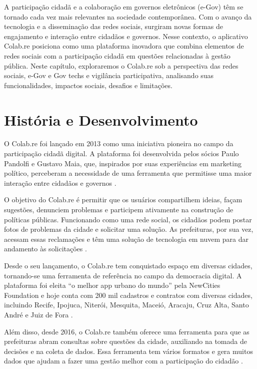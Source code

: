 A participação cidadã e a colaboração em governos eletrônicos (e-Gov) têm se tornado cada vez mais relevantes na sociedade contemporânea. Com o avanço da tecnologia e a disseminação das redes sociais, surgiram novas formas de engajamento e interação entre cidadãos e governos. Nesse contexto, o aplicativo Colab.re posiciona como uma plataforma inovadora que combina elementos de redes sociais com a participação cidadã em questões relacionadas à gestão pública. Neste capítulo, exploraremos o Colab.re sob a perspectiva das redes sociais, e-Gov e Gov techs e vigilância participativa, analisando suas funcionalidades, impactos sociais, desafios e limitações.


\section*{História e Desenvolvimento}
O Colab.re foi lançado em 2013 como uma iniciativa pioneira no campo da participação cidadã digital. A plataforma foi desenvolvida pelos sócios Paulo Pandolfi e Gustavo Maia, que, inspirados por suas experiências em marketing político, perceberam a necessidade de uma ferramenta que permitisse uma maior interação entre cidadãos e governos \cite{2023_Colab_PAGE}.

O objetivo do Colab.re é permitir que os usuários compartilhem ideias, façam sugestões, denunciem problemas e participem ativamente na construção de políticas públicas. Funcionando como uma rede social, os cidadãos podem postar fotos de problemas da cidade e solicitar uma solução. As prefeituras, por sua vez, acessam essas reclamações e têm uma solução de tecnologia em nuvem para dar andamento às solicitações \cite{2023_Colab_PAGE}.

Desde o seu lançamento, o Colab.re tem conquistado espaço em diversas cidades, tornando-se uma ferramenta de referência no campo da democracia digital. A plataforma foi eleita “o melhor app urbano do mundo” pela NewCities Foundation e hoje conta com 200 mil cadastros e contratos com diversas cidades, incluindo Recife, Ipojuca, Niterói, Mesquita, Maceió, Aracaju, Cruz Alta, Santo André e Juiz de Fora \cite{2023_Colab_PAGE}.

Além disso, desde 2016, o Colab.re também oferece uma ferramenta para que as prefeituras abram consultas sobre questões da cidade, auxiliando na tomada de decisões e na coleta de dados. Essa ferramenta tem vários formatos e gera muitos dados que ajudam a fazer uma gestão melhor com a participação do cidadão \cite{2023_Colab_PAGE}.

